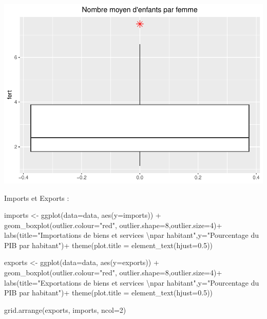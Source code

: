 \documentclass[
]{article}
\newenvironment{Shaded}{\begin{snugshade}}{\end{snugshade}}
\newcommand{\AttributeTok}[1]{\textcolor[rgb]{0.77,0.63,0.00}{#1}}
\newcommand{\DecValTok}[1]{\textcolor[rgb]{0.00,0.00,0.81}{#1}}
\newcommand{\FloatTok}[1]{\textcolor[rgb]{0.00,0.00,0.81}{#1}}
\newcommand{\FunctionTok}[1]{\textcolor[rgb]{0.00,0.00,0.00}{#1}}
\newcommand{\NormalTok}[1]{#1}
\newcommand{\OtherTok}[1]{\textcolor[rgb]{0.56,0.35,0.01}{#1}}
\newcommand{\SpecialCharTok}[1]{\textcolor[rgb]{0.00,0.00,0.00}{#1}}
\newcommand{\StringTok}[1]{\textcolor[rgb]{0.31,0.60,0.02}{#1}}
\begin{document}
\includegraphics{projet_apprentissage_non_supp_files/figure-latex/unnamed-chunk-9-1.pdf}

Imports et Exports :

\begin{Shaded}
\begin{Highlighting}[]
\NormalTok{imports }\OtherTok{\textless{}{-}} \FunctionTok{ggplot}\NormalTok{(}\AttributeTok{data=}\NormalTok{data, }\FunctionTok{aes}\NormalTok{(}\AttributeTok{y=}\NormalTok{imports)) }\SpecialCharTok{+} 
  \FunctionTok{geom\_boxplot}\NormalTok{(}\AttributeTok{outlier.colour=}\StringTok{"red"}\NormalTok{, }\AttributeTok{outlier.shape=}\DecValTok{8}\NormalTok{,}\AttributeTok{outlier.size=}\DecValTok{4}\NormalTok{)}\SpecialCharTok{+}
  \FunctionTok{labs}\NormalTok{(}\AttributeTok{title=}\StringTok{"Importations de biens et services }\SpecialCharTok{\textbackslash{}n}\StringTok{par habitant"}\NormalTok{,}\AttributeTok{y=}\StringTok{"Pourcentage du PIB par habitant"}\NormalTok{)}\SpecialCharTok{+}
  \FunctionTok{theme}\NormalTok{(}\AttributeTok{plot.title =} \FunctionTok{element\_text}\NormalTok{(}\AttributeTok{hjust=}\FloatTok{0.5}\NormalTok{))}

\NormalTok{exports }\OtherTok{\textless{}{-}} \FunctionTok{ggplot}\NormalTok{(}\AttributeTok{data=}\NormalTok{data, }\FunctionTok{aes}\NormalTok{(}\AttributeTok{y=}\NormalTok{exports)) }\SpecialCharTok{+} 
  \FunctionTok{geom\_boxplot}\NormalTok{(}\AttributeTok{outlier.colour=}\StringTok{"red"}\NormalTok{, }\AttributeTok{outlier.shape=}\DecValTok{8}\NormalTok{,}\AttributeTok{outlier.size=}\DecValTok{4}\NormalTok{)}\SpecialCharTok{+}
  \FunctionTok{labs}\NormalTok{(}\AttributeTok{title=}\StringTok{"Exportations de biens et services }\SpecialCharTok{\textbackslash{}n}\StringTok{par habitant"}\NormalTok{,}\AttributeTok{y=}\StringTok{"Pourcentage du PIB par habitant"}\NormalTok{)}\SpecialCharTok{+}
  \FunctionTok{theme}\NormalTok{(}\AttributeTok{plot.title =} \FunctionTok{element\_text}\NormalTok{(}\AttributeTok{hjust=}\FloatTok{0.5}\NormalTok{))}

\FunctionTok{grid.arrange}\NormalTok{(exports, imports, }\AttributeTok{ncol=}\DecValTok{2}\NormalTok{)}
\end{Highlighting}
\end{Shaded}
\end{document}
